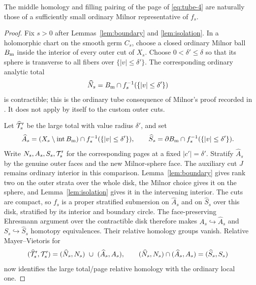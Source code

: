 \begin{lemma}\label{lem:local}
The middle homology and filling pairing of the page of \eqref{eq:tube-4}
are naturally those of a sufficiently small ordinary Milnor
representative of \(f_s\).
\end{lemma}
\begin{proof}
Fix \(s>0\) after Lemmas~\ref{lem:boundary} and
\ref{lem:isolation}. In a holomorphic chart on the smooth germ
\(C_s\), choose a closed ordinary Milnor ball \(B_{\rm m}\) inside
the interior of every outer cut of \(X_s\). Choose
\(0<\delta'\le\delta\) so that its sphere is transverse to all
fibers over \(\{|v|\le\delta'\}\). The corresponding ordinary
analytic total
\[
 \widehat N_s=B_{\rm m}\cap f_s^{-1}(\{|v|\le\delta'\})
\]
is contractible; this is the ordinary tube consequence of Milnor's
proof recorded in \cite[Theorem~1.8 and Remark~1.9]{Massey2015LeCycles}.
It does not apply by itself to the custom outer cuts.

Let \(\widehat{\mathcal T}_s'\) be the large total with value radius
\(\delta'\), and set
\[
 \widehat A_s=(X_s\setminus\operatorname{int}B_{\rm m})
              \cap f_s^{-1}(\{|v|\le\delta'\}),\qquad
 \widehat S_s=\partial B_{\rm m}
              \cap f_s^{-1}(\{|v|\le\delta'\}).
\]
Write \(N_s,A_s,S_s,\mathcal T_s'\) for the corresponding pages at a fixed
\(\lvert c'\rvert=\delta'\). Stratify \(\widehat A_s\) by the
genuine outer faces and the new Milnor-sphere face. The auxiliary
cut \(J\) remains ordinary interior in this comparison.
Lemma~\ref{lem:boundary} gives rank two on the outer strata over
the whole disk, the Milnor choice gives it on the sphere, and
Lemma~\ref{lem:isolation} gives it in the intervening interior.
The cuts are compact, so \(f_s\) is a proper stratified submersion
on \(\widehat A_s\) and on \(\widehat S_s\) over this disk,
stratified by its interior and boundary circle.
The face-preserving Ehresmann argument over the contractible disk
therefore makes \(A_s\hookrightarrow\widehat A_s\) and
\(S_s\hookrightarrow\widehat S_s\) homotopy equivalences.
Their relative homology groups vanish. Relative Mayer--Vietoris
for
\[
 (\widehat{\mathcal T}_s',\mathcal T_s')
   =(\widehat N_s,N_s)\ \cup\ (\widehat A_s,A_s),
 \qquad
 (\widehat N_s,N_s)\cap(\widehat A_s,A_s)
   =(\widehat S_s,S_s)
\]
now identifies the large total/page relative homology with the
ordinary local one.


\end{proof}
